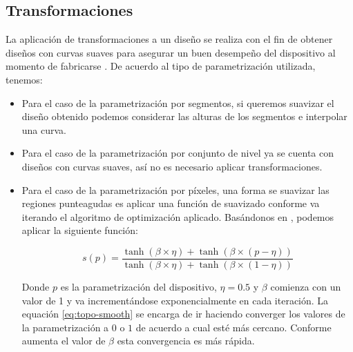 \subsection{Transformaciones}

La aplicación de transformaciones a un diseño se realiza con el fin de obtener diseños con curvas suaves para asegurar un buen desempeño del dispositivo al momento de fabricarse \citep{Su2020}. 
De acuerdo al tipo de parametrización utilizada, tenemos:

\begin{itemize}
  \item Para el caso de la parametrización por segmentos, si queremos suavizar el diseño obtenido podemos considerar las alturas de los segmentos e interpolar una curva.

  \item Para el caso de la parametrización por conjunto de nivel ya se cuenta con diseños con curvas suaves, así no es necesario aplicar transformaciones.

  \item Para el caso de la parametrización por píxeles, una forma se suavizar las regiones punteagudas es aplicar una función de suavizado conforme va iterando el algoritmo de optimización aplicado. Basándonos en \cite{Zhang2021}, podemos aplicar la siguiente función:

\begin{equation}
  s(p) = \frac{\tanh (\beta \times \eta) + \tanh (\beta \times (p - \eta))}{\tanh (\beta \times \eta) + \tanh (\beta \times (1 - \eta))}
  \label{eq:topo-smooth}
\end{equation}

    Donde $p$ es la parametrización del dispositivo, $\eta = 0.5$ y $\beta$ comienza con un valor de 1 y va incrementándose exponencialmente en cada iteración. 
    La equación \ref{eq:topo-smooth} se encarga de ir haciendo converger los valores de la parametrización a $0$ o $1$ de acuerdo a cual esté más cercano. 
    Conforme aumenta el valor de $\beta$ esta convergencia es más rápida.

\end{itemize}


